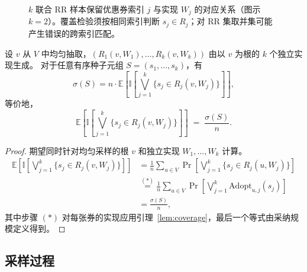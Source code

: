 \documentclass[sigconf,balance=false]{acmart}
\newcommand{\E}{\mathbb{E}}
\newcommand{\I}{\mathbb{I}}
\begin{document}
\begin{figure}[t]
  \caption{$k$ 联合 RR 样本保留优惠券索引 $j$ 与实现 $W_j$ 的对应关系（图示 $k=2$）。覆盖检验须按相同索引判断 $s_j\in R_j$；对 RR 集取并集可能产生错误的跨索引匹配。}
  \label{fig:joint-rr}
\end{figure}

\begin{lemma}[无偏性]
\label{lem:unbiased}
设 $v$ 从 $V$ 中均匀抽取，$(R_1(v,W_1),\ldots,R_k(v,W_k))$ 由以 $v$ 为根的 $k$ 个独立实现生成。
对于任意有序种子元组 $S=(s_1,\ldots,s_k)$，有
\[
  \sigma(S)
  = n\cdot
  \E\!\left[
    \I\!\left[\bigvee_{j=1}^{k} \{s_j \in R_j(v,W_j)\}\right]
  \right],
\]
等价地，
\[
  \E\!\left[
    \I\!\left[\bigvee_{j=1}^{k} \{s_j \in R_j(v,W_j)\}\right]
  \right]
  \;=\; \frac{\sigma(S)}{n}.
\]
\end{lemma}

\begin{proof}
期望同时针对均匀采样的根 $v$ 和独立实现 $W_1,\ldots,W_k$ 计算。
\begin{align*}
  \E\!\left[
    \I\!\left[\bigvee_{j=1}^k \{s_j \in R_j(v,W_j)\}\right]
  \right]
  &= \frac{1}{n}\sum_{u\in V}
     \Pr\!\left[\bigvee_{j=1}^k \{s_j \in R_j(u,W_j)\}\right] \\
  &\stackrel{(*)}{=}
     \frac{1}{n}\sum_{u\in V}
     \Pr\!\left[\bigvee_{j=1}^k \mathrm{Adopt}_{u,j}(s_j)\right] \\
  &= \frac{\sigma(S)}{n},
\end{align*}
其中步骤 $(*)$ 对每张券的实现应用引理~\ref{lem:coverage}，最后一个等式由采纳规模定义得到。
\end{proof}

\subsection{采样过程}
\end{document}
